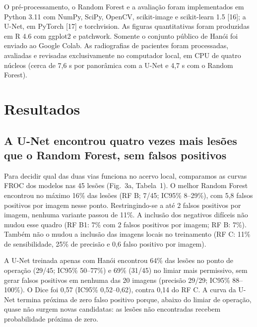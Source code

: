 \documentclass[twocolumn]{article}
\begin{document}
O pré-processamento, o Random Forest e a avaliação foram implementados em Python 3.11 com NumPy, SciPy, OpenCV, scikit-image e scikit-learn 1.5 [16]; a U-Net, em PyTorch [17] e torchvision. As figuras quantitativas foram produzidas em R 4.6 com ggplot2 e patchwork. Somente o conjunto público de Hanói foi enviado ao Google Colab. As radiografias de pacientes foram processadas, avaliadas e revisadas exclusivamente no computador local, em CPU de quatro núcleos (cerca de 7,6 s por panorâmica com a U-Net e 4,7 s com o Random Forest).

\section{Resultados}

\subsection{A U-Net encontrou quatro vezes mais lesões que o Random Forest, sem falsos positivos}

Para decidir qual das duas vias funciona no acervo local, comparamos as curvas FROC dos modelos nas 45 lesões (Fig.~3a, Tabela~1). O melhor Random Forest encontrou no máximo 16\% das lesões (RF B; 7/45; IC95\% 8--29\%), com 5,8 falsos positivos por imagem nesse ponto. Restringindo-se a até 2 falsos positivos por imagem, nenhuma variante passou de 11\%. A inclusão dos negativos difíceis não mudou esse quadro (RF B1: 7\% com 2 falsos positivos por imagem; RF B: 7\%). Também não o mudou a inclusão das imagens locais no treinamento (RF C: 11\% de sensibilidade, 25\% de precisão e 0,6 falso positivo por imagem).

A U-Net treinada apenas com Hanói encontrou 64\% das lesões no ponto de operação (29/45; IC95\% 50--77\%) e 69\% (31/45) no limiar mais permissivo, sem gerar falsos positivos em nenhuma das 20 imagens (precisão 29/29; IC95\% 88--100\%). O Dice foi 0,57 (IC95\% 0,52--0,62), contra 0,14 do RF C. A curva da U-Net termina próxima de zero falso positivo porque, abaixo do limiar de operação, quase não surgem novas candidatas: as lesões não encontradas recebem probabilidade próxima de zero.

\end{document}
